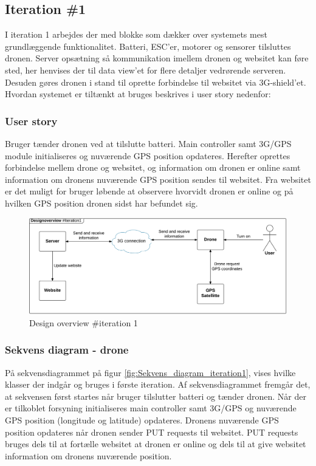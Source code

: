 \subsection{Iteration \#1}
I iteration 1 arbejdes der med blokke som dækker over systemets mest grundlæggende funktionalitet. Batteri,
ESC’er, motorer og sensorer tilsluttes dronen. Server opsætning så kommunikation imellem dronen og websitet kan føre sted, her henvises der til data view'et for flere detaljer vedrørende serveren. Desuden gøres dronen i stand til oprette forbindelse til websitet via 3G-shield’et. Hvordan systemet er tiltænkt at bruges beskrives i user story nedenfor:

\subsubsection*{User story}
Bruger tænder dronen ved at tilslutte batteri. Main controller samt 3G/GPS module initialiseres og nuværende GPS position opdateres. Herefter oprettes forbindelse mellem drone og websitet, og information om dronen er online samt information om dronens nuværende GPS position sendes til websitet. Fra websitet er det muligt for bruger løbende at observere hvorvidt dronen er online og på hvilken GPS position dronen sidst har befundet sig.

\begin{figure}[H]
	\centering
	\includegraphics[width=1\textwidth]{Billeder/design_overview/design_overview_iteration1.png}
	\vspace{-.5cm}
	\caption{Design overview \#iteration 1}
	\label{fig:design_overview_UC1}
\end{figure}


\newpage
\subsubsection*{Sekvens diagram - drone}
På sekvensdiagrammet på figur \ref{fig:Sekvens_diagram_iteration1}, vises hvilke klasser der indgår og bruges i første iteration. Af sekvensdiagrammet fremgår det, at sekvensen først startes når bruger tilslutter batteri og tænder dronen. Når der er tilkoblet forsyning initialiseres main controller samt 3G/GPS og nuværende GPS position  (longitude og latitude) opdateres. Dronens nuværende GPS position opdateres når dronen sender PUT requests til websitet. PUT requests bruges dels til at fortælle websitet at dronen er online og dels til at give websitet information om dronens nuværende position. 


